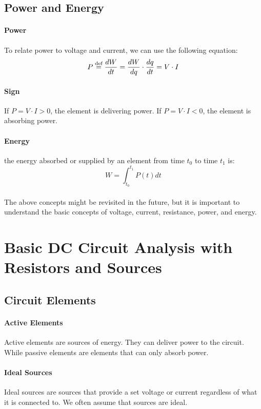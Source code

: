 \documentclass[11pt]{report}
\begin{document}
\subsection{Power and Energy}
\paragraph{Power} To relate power to  voltage and current, we can use the following equation:
\begin{equation}
    P \stackrel{\text{def}}{=} \frac{dW}{dt} = \frac{dW}{dq} \cdot \frac{dq}{dt} = V \cdot I
\end{equation}
\paragraph{Sign} If $P = V \cdot I > 0$, the element is delivering power. If $P = V \cdot I < 0$, the element is absorbing power.
\paragraph{Energy}  the energy absorbed or supplied by an element
from time $t_0$ to time $t_1$ is:
\begin{equation}
    W = \int_{t_0}^{t_1} P(t) dt
\end{equation}
\paragraph{} The above concepts might be revisited in the future, but it is important to understand the basic concepts of voltage, current, resistance, power, and energy.
\section{Basic DC Circuit Analysis with Resistors and Sources}
\subsection{Circuit Elements}
\paragraph{Active Elements} Active elements are sources of energy. They can deliver power to the circuit. While passive elements are elements that can only absorb power.
\paragraph{Ideal Sources} Ideal sources are sources that provide a set voltage or current regardless of what it is connected to. We often assume that sources are ideal.
\end{document}
